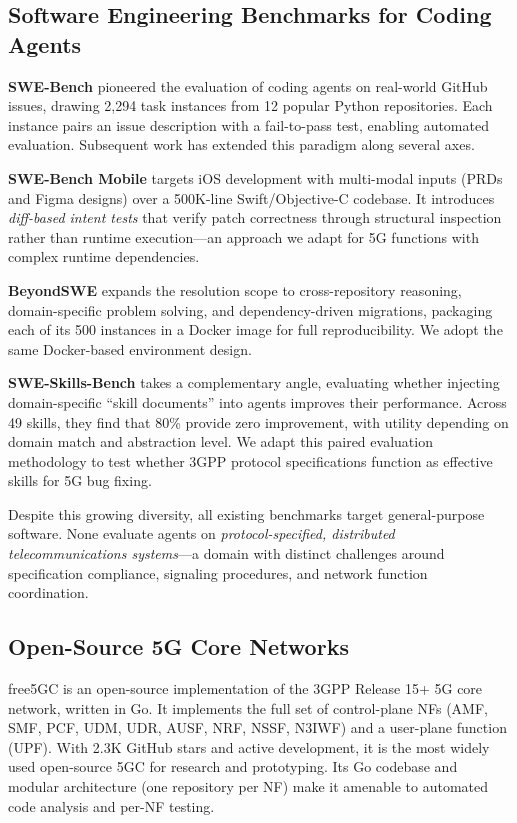 \documentclass{article}
\begin{document}
\subsection{Software Engineering Benchmarks for Coding Agents}

\textbf{SWE-Bench} \citep{jimenez2024swebench} pioneered the evaluation of coding agents on real-world GitHub issues, drawing 2,294 task instances from 12 popular Python repositories. Each instance pairs an issue description with a fail-to-pass test, enabling automated evaluation. Subsequent work has extended this paradigm along several axes.

\textbf{SWE-Bench Mobile} \citep{yao2025swebenchmobile} targets iOS development with multi-modal inputs (PRDs and Figma designs) over a 500K-line Swift/Objective-C codebase. It introduces \emph{diff-based intent tests} that verify patch correctness through structural inspection rather than runtime execution---an approach we adapt for 5G functions with complex runtime dependencies.

\textbf{BeyondSWE} \citep{shi2025beyondswe} expands the resolution scope to cross-repository reasoning, domain-specific problem solving, and dependency-driven migrations, packaging each of its 500 instances in a Docker image for full reproducibility. We adopt the same Docker-based environment design.

\textbf{SWE-Skills-Bench} \citep{han2025sweskills} takes a complementary angle, evaluating whether injecting domain-specific ``skill documents'' into agents improves their performance. Across 49 skills, they find that 80\% provide zero improvement, with utility depending on domain match and abstraction level. We adapt this paired evaluation methodology to test whether 3GPP protocol specifications function as effective skills for 5G bug fixing.

Despite this growing diversity, all existing benchmarks target general-purpose software. None evaluate agents on \emph{protocol-specified, distributed telecommunications systems}---a domain with distinct challenges around specification compliance, signaling procedures, and network function coordination.

\subsection{Open-Source 5G Core Networks}

free5GC \citep{free5gc} is an open-source implementation of the 3GPP Release 15+ 5G core network, written in Go. It implements the full set of control-plane NFs (AMF, SMF, PCF, UDM, UDR, AUSF, NRF, NSSF, N3IWF) and a user-plane function (UPF). With 2.3K GitHub stars and active development, it is the most widely used open-source 5GC for research and prototyping. Its Go codebase and modular architecture (one repository per NF) make it amenable to automated code analysis and per-NF testing.
\end{document}
